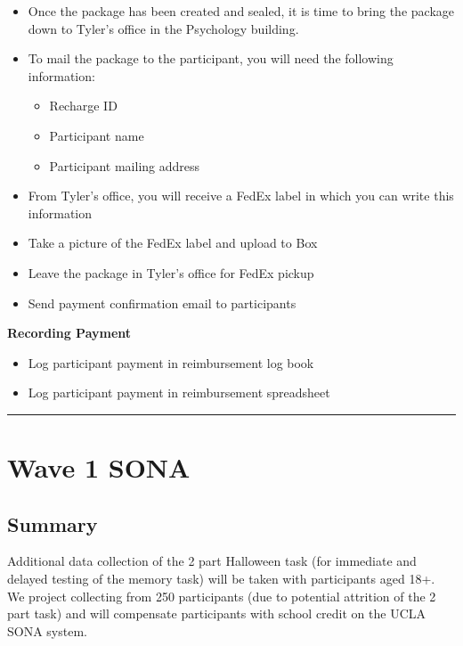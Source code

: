 \documentclass[]{book}
\providecommand{\tightlist}{%
  \setlength{\itemsep}{0pt}\setlength{\parskip}{0pt}}
\begin{document}
\begin{itemize}
\tightlist
\item
  Once the package has been created and sealed, it is time to bring the package down to Tyler's office in the Psychology building.
\item
  To mail the package to the participant, you will need the following information:

  \begin{itemize}
  \tightlist
  \item
    Recharge ID
  \item
    Participant name
  \item
    Participant mailing address
  \end{itemize}
\item
  From Tyler's office, you will receive a FedEx label in which you can write this information
\item
  Take a picture of the FedEx label and upload to Box
\item
  Leave the package in Tyler's office for FedEx pickup
\item
  Send payment confirmation email to participants
\end{itemize}

\textbf{Recording Payment}

\begin{itemize}
\tightlist
\item
  Log participant payment in reimbursement log book
\item
  Log participant payment in reimbursement spreadsheet
\end{itemize}

\begin{center}\rule{0.5\linewidth}{0.5pt}\end{center}

\hypertarget{wave-1-sona}{%
\chapter{Wave 1 SONA}\label{wave-1-sona}}

\hypertarget{summary-1}{%
\section{Summary}\label{summary-1}}

Additional data collection of the 2 part Halloween task (for immediate and delayed testing of the memory task) will be taken with participants aged 18+. We project collecting from 250 participants (due to potential attrition of the 2 part task) and will compensate participants with school credit on the UCLA SONA system.
\end{document}
